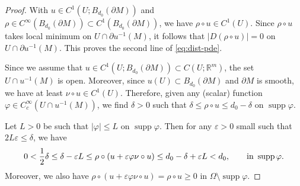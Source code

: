 \documentclass[11pt]{amsart}
\newcommand{\R}{{\mathbb R}}
\newcommand{\e}{\varepsilon}
\newcommand{\vp}{\varphi}
\newcommand{\supp}{\operatorname{supp}}
\theoremstyle{plain}
\theoremstyle{definition}
\theoremstyle{remark}
\numberwithin{equation}{section}
\begin{document}
\begin{proof}
With $u\in C^1(U;{B_{d_0}(\partial M)})$ and $\rho\in C^\infty({B_{d_0}(\partial M)})\subset C^1({B_{d_0}(\partial M)})$, we have $\rho\circ u \in C^1(U)$. 
Since $\rho\circ u$ takes local minimum on $U\cap\partial u^{-1}(M)$, it follows that $|D(\rho\circ u)| = 0$ on $U\cap\partial u^{-1}(M)$. This proves the second line of \eqref{eq:dist-pde}. 

Since we assume that $u\in C^1(U;B_{d_0}(\partial M))\subset C(U;\R^m)$, the set $U\cap u^{-1}(M)$ is open. Moreover, since $u(U)\subset B_{d_0}(\partial M)$ and $\partial M$ is smooth, we have at least $\nu\circ u\in C^1(U)$. Therefore, given any (scalar)  function $\vp \in C_c^\infty(U\cap u^{-1}(M))$, we find $\delta > 0$ such that $\delta \leq \rho\circ u\leq d_0- \delta$ on $\supp\vp$.

Let $L > 0$ be such that $|\vp|\leq L$ on $\supp\vp$. Then for any $\e > 0$ small such that $2L\e \leq \delta$, we have 
$$0 <  \frac{1}{2}\delta  \leq \delta - \e L \leq  \rho \circ (u + \e \vp \nu\circ u)    
\leq d_0 - \delta + \e L < d_0, \qquad \hbox{in } \supp\vp.$$ 
Moreover, we also have $\rho\circ (u + \e \vp\nu\circ u) = \rho\circ u \geq 0$ in $\Omega\setminus\supp\vp$.





\end{proof}
\end{document}
